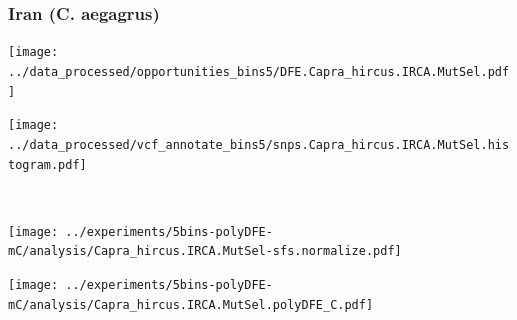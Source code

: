 \subsubsection{Iran (C. aegagrus)}

\begin{minipage}{0.49\linewidth}
    \texttt{[image: ../data\_processed/opportunities\_bins5/DFE.Capra\_hircus.IRCA.MutSel.pdf]}
\end{minipage}
\begin{minipage}{0.49\linewidth}
    \texttt{[image: ../data\_processed/vcf\_annotate\_bins5/snps.Capra\_hircus.IRCA.MutSel.histogram.pdf]}
\end{minipage}
\\
\begin{minipage}{0.49\linewidth}
    \texttt{[image: ../experiments/5bins-polyDFE-mC/analysis/Capra\_hircus.IRCA.MutSel-sfs.normalize.pdf]}
\end{minipage}
\begin{minipage}{0.4\linewidth}
    \texttt{[image: ../experiments/5bins-polyDFE-mC/analysis/Capra\_hircus.IRCA.MutSel.polyDFE\_C.pdf]}
\end{minipage}
